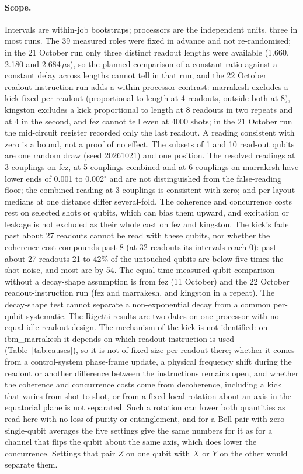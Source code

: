 \documentclass[reprint,amsmath,amssymb,aps,superscriptaddress,nofootinbib]{revtex4-2}
\newcommand{\us}{\,$\mu$s}
\begin{document}
\paragraph*{Scope.} Intervals are within-job bootstraps; processors are the independent units, three in most runs. The 39 measured roles were fixed in advance and not re-randomised; in the 21 October run only three distinct readout lengths were available (1.660, 2.180 and 2.684\us), so the planned comparison of a constant ratio against a constant delay across lengths cannot tell in that run, and the 22 October readout-instruction run adds a within-processor contrast: marrakesh excludes a kick fixed per readout (proportional to length at 4 readouts, outside both at 8), kingston excludes a kick proportional to length at 8 readouts in two repeats and at 4 in the second, and fez cannot tell even at 4000 shots; in the 21 October run the mid-circuit register recorded only the last readout. A reading consistent with zero is a bound, not a proof of no effect. The subsets of 1 and 10 read-out qubits are one random draw (seed 20261021) and one position. The resolved readings at 3 couplings on fez, at 5 couplings combined and at 6 couplings on marrakesh have lower ends of 0.001 to 0.002$^\circ$ and are not distinguished from the false-reading floor; the combined reading at 3 couplings is consistent with zero; and per-layout medians at one distance differ several-fold. The coherence and concurrence costs rest on selected shots or qubits, which can bias them upward, and excitation or leakage is not excluded as their whole cost on fez and kingston. The kick's fade past about 27 readouts cannot be read with these qubits, nor whether the coherence cost compounds past 8 (at 32 readouts its intervals reach 0): past about 27 readouts 21 to 42\% of the untouched qubits are below five times the shot noise, and most are by 54. The equal-time measured-qubit comparison without a decay-shape assumption is from fez (11 October) and the 22 October readout-instruction run (fez and marrakesh, and kingston in a repeat). The decay-shape test cannot separate a non-exponential decay from a common per-qubit systematic. The Rigetti results are two dates on one processor with no equal-idle readout design. The mechanism of the kick is not identified: on ibm\_marrakesh it depends on which readout instruction is used (Table~\ref{tab:causes}), so it is not of fixed size per readout there; whether it comes from a control-system phase-frame update, a physical frequency shift during the readout or another difference between the instructions remains open, and whether the coherence and concurrence costs come from decoherence, including a kick that varies from shot to shot, or from a fixed local rotation about an axis in the equatorial plane is not separated. Such a rotation can lower both quantities as read here with no loss of purity or entanglement, and for a Bell pair with zero single-qubit averages the five settings give the same numbers for it as for a channel that flips the qubit about the same axis, which does lower the concurrence. Settings that pair $Z$ on one qubit with $X$ or $Y$ on the other would separate them.
\end{document}
